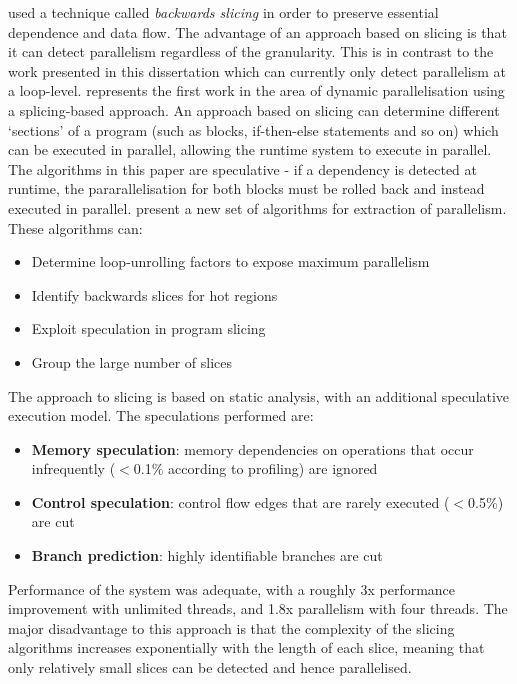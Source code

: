 \citet{Wang2009} used a technique called \textit{backwards slicing} \citep{Weiser} in order to preserve essential dependence and data flow. The advantage of an approach based on slicing is that it can detect parallelism regardless of the granularity. This is in contrast to the work presented in this dissertation which can currently only detect parallelism at a loop-level. \citet{Wang2009} represents the first work in the area of dynamic parallelisation using a splicing-based approach. An approach based on slicing can determine different `sections' of a program (such as blocks, if-then-else statements and so on) which can be executed in parallel, allowing the runtime system to execute in parallel. The algorithms in this paper are speculative - if a dependency is detected at runtime, the pararallelisation for both blocks must be rolled back and instead executed in parallel. \citeauthor{Wang2009} present a new set of algorithms for extraction of parallelism. These algorithms can:

\begin{itemize}
        \item Determine loop-unrolling factors to expose maximum parallelism
        \item Identify backwards slices for hot regions
        \item Exploit speculation in program slicing
        \item Group the large number of slices
\end{itemize}

The approach to slicing is based on static analysis, with an additional speculative execution model. The speculations performed are:

\begin{itemize}
        \item \textbf{Memory speculation}: memory dependencies on operations that occur infrequently ($<$0.1\% according to profiling) are ignored
        \item \textbf{Control speculation}: control flow edges that are rarely executed ($<$0.5\%) are cut
        \item \textbf{Branch prediction}: highly identifiable branches are cut
\end{itemize}

Performance of the system was adequate, with a roughly 3x performance improvement with unlimited threads, and 1.8x parallelism with four threads. The major disadvantage to this approach is that the complexity of the slicing algorithms increases exponentially with the length of each slice, meaning that only relatively small slices can be detected and hence parallelised.

